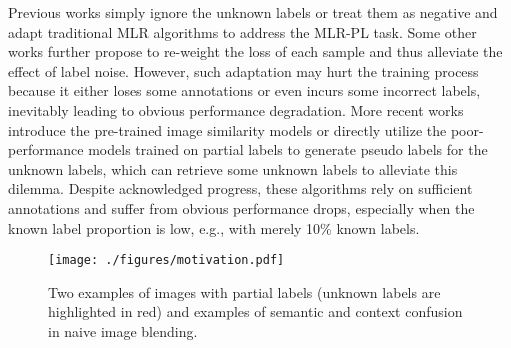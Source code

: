\documentclass[lettersize,journal]{IEEEtran}
\begin{document}
Previous works \cite{Sun2017ICCV, Joulin2016ECCV} simply ignore the unknown labels or treat them as negative and adapt traditional MLR algorithms to address the MLR-PL task. Some other works \cite{Kim2022LargeLoss, Pu2022MLR-PPL} further propose to re-weight the loss of each sample and thus alleviate the effect of label noise. However, such adaptation may hurt the training process because it either loses some annotations or even incurs some incorrect labels, inevitably leading to obvious performance degradation. More recent works \cite{Durand2019CVPR, Huynh2020CVPR} introduce the pre-trained image similarity models or directly utilize the poor-performance models trained on partial labels to generate pseudo labels for the unknown labels, which can retrieve some unknown labels to alleviate this dilemma. Despite acknowledged progress, these algorithms rely on sufficient annotations and suffer from obvious performance drops, especially when the known label proportion is low, e.g., with merely 10\% known labels.

\begin{figure}[!t] 
  \centering
  \texttt{[image: ./figures/motivation.pdf]}
  \caption{Two examples of images with partial labels (unknown labels are highlighted in red) and examples of semantic and context confusion in naive image blending.} 
  \label{fig:motivation}     
\end{figure}
\end{document}
